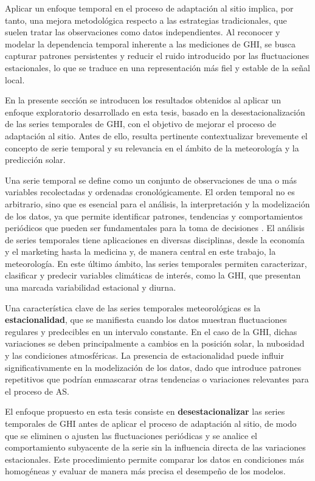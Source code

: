 \documentclass[letterpaper,12pt, twoside]{report}
\providecommand{\DIFdeltex}[1]{{\protect\color{red} \scriptsize #1}} %
\providecommand{\DIFdel}[1]{\texorpdfstring{\DIFdeltex{#1}}{}} %
\begin{document}
\DIFdel{Aplicar un enfoque temporal en el proceso de adaptación al sitio implica, por tanto, una mejora metodológica respecto a las estrategias tradicionales, que suelen tratar las observaciones como datos independientes. Al reconocer y modelar la dependencia temporal inherente a las mediciones de GHI, se busca capturar patrones persistentes y reducir el ruido introducido por las fluctuaciones estacionales, lo que se traduce en una representación más fiel y estable de la señal local.
}%

\DIFdel{En la presente sección se introducen los resultados obtenidos al aplicar un enfoque exploratorio desarrollado en esta tesis, basado en la desestacionalización de las series temporales de GHI, con el objetivo de mejorar el proceso de adaptación al sitio. Antes de ello, resulta pertinente contextualizar brevemente el concepto de serie temporal y su relevancia en el ámbito de la meteorología y la predicción solar.
}%

\DIFdel{Una serie temporal se define como un conjunto de observaciones de una o más variables recolectadas y ordenadas cronológicamente. El orden temporal no es arbitrario, sino que es esencial para el análisis, la interpretación y la modelización de los datos, ya que permite identificar patrones, tendencias y comportamientos periódicos que pueden ser fundamentales para la toma de decisiones \citep{Olivas2022}. El análisis de series temporales tiene aplicaciones en diversas disciplinas, desde la economía y el marketing hasta la medicina y, de manera central en este trabajo, la meteorología. En este último ámbito, las series temporales permiten caracterizar, clasificar y predecir variables climáticas de interés, como la GHI, que presentan una marcada variabilidad estacional y diurna.
}%

\DIFdel{Una característica clave de las series temporales meteorológicas es la \textbf{estacionalidad}, que se manifiesta cuando los datos muestran fluctuaciones regulares y predecibles en un intervalo constante. En el caso de la GHI, dichas variaciones se deben principalmente a cambios en la posición solar, la nubosidad y las condiciones atmosféricas. La presencia de estacionalidad puede influir significativamente en la modelización de los datos, dado que introduce patrones repetitivos que podrían enmascarar otras tendencias o variaciones relevantes para el proceso de AS.
}%

\DIFdel{El enfoque propuesto en esta tesis consiste en \textbf{desestacionalizar} las series temporales de GHI antes de aplicar el proceso de adaptación al sitio, de modo que se eliminen o ajusten las fluctuaciones periódicas y se analice el comportamiento subyacente de la serie sin la influencia directa de las variaciones estacionales. Este procedimiento permite comparar los datos en condiciones más homogéneas y evaluar de manera más precisa el desempeño de los modelos.}%
\end{document}

